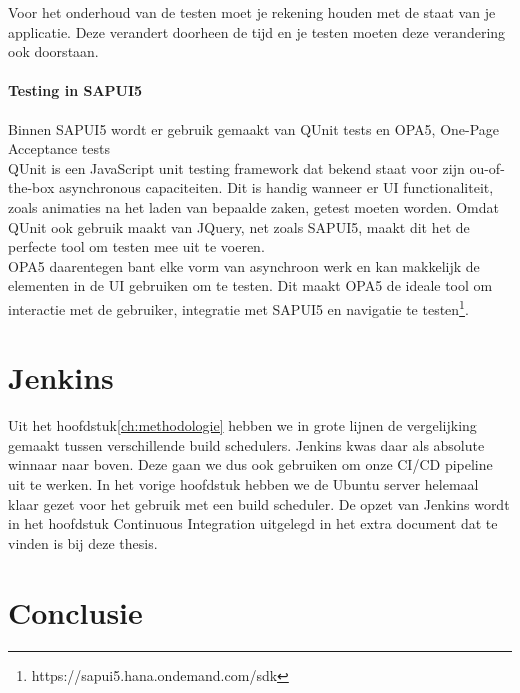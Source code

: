 Voor het onderhoud van de testen moet je rekening houden met de staat van je applicatie. Deze verandert doorheen de tijd en je testen moeten deze verandering ook doorstaan.

    \paragraph{Testing in SAPUI5}
    Binnen SAPUI5 wordt er gebruik gemaakt van QUnit tests en OPA5, One-Page Acceptance tests\\
    QUnit is een JavaScript unit testing framework dat bekend staat voor zijn ou-of-the-box asynchronous capaciteiten. Dit is handig wanneer er UI functionaliteit, zoals animaties na het laden van bepaalde zaken, getest moeten worden. Omdat QUnit ook gebruik maakt van JQuery, net zoals SAPUI5, maakt dit het de perfecte tool om testen mee uit te voeren.\\
    OPA5 daarentegen bant elke vorm van asynchroon werk en kan makkelijk de elementen in de UI gebruiken om te testen. Dit maakt OPA5 de ideale tool om interactie met de gebruiker, integratie met SAPUI5 en navigatie te testen\footnote{https://sapui5.hana.ondemand.com/sdk}.

\section{Jenkins}
\label{sec:short-list}
Uit het hoofdstuk\ref{ch:methodologie} hebben we in grote lijnen de vergelijking gemaakt tussen verschillende build schedulers. Jenkins kwas daar als absolute winnaar naar boven. Deze gaan we dus ook gebruiken om onze CI/CD pipeline uit te werken.
In het vorige hoofdstuk hebben we de Ubuntu server helemaal klaar gezet voor het gebruik met een build scheduler. De opzet van Jenkins wordt in het hoofdstuk Continuous Integration uitgelegd in het extra document dat te vinden is bij deze thesis.
    
    
    
\section{Conclusie}
\label{sec:conclusie}
